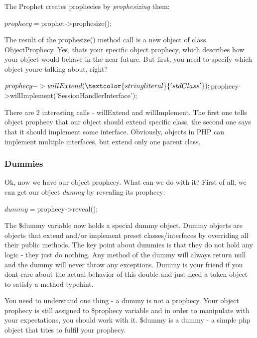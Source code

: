 The Prophet creates prophecies by {\itshape prophesizing} them\+:


\begin{DoxyCode}
$prophecy = $prophet->prophesize();
\end{DoxyCode}


The result of the {\ttfamily prophesize()} method call is a new object of class {\ttfamily Object\+Prophecy}. Yes, that\textquotesingle{}s your specific object prophecy, which describes how your object would behave in the near future. But first, you need to specify which object you\textquotesingle{}re talking about, right?


\begin{DoxyCode}
$prophecy->willExtend(\textcolor{stringliteral}{'stdClass'});
$prophecy->willImplement(\textcolor{stringliteral}{'SessionHandlerInterface'});
\end{DoxyCode}


There are 2 interesting calls -\/ {\ttfamily will\+Extend} and {\ttfamily will\+Implement}. The first one tells object prophecy that our object should extend specific class, the second one says that it should implement some interface. Obviously, objects in P\+HP can implement multiple interfaces, but extend only one parent class.

\subsubsection*{Dummies}

Ok, now we have our object prophecy. What can we do with it? First of all, we can get our object {\itshape dummy} by revealing its prophecy\+:


\begin{DoxyCode}
$dummy = $prophecy->reveal();
\end{DoxyCode}


The {\ttfamily \$dummy} variable now holds a special dummy object. Dummy objects are objects that extend and/or implement preset classes/interfaces by overriding all their public methods. The key point about dummies is that they do not hold any logic -\/ they just do nothing. Any method of the dummy will always return {\ttfamily null} and the dummy will never throw any exceptions. Dummy is your friend if you don\textquotesingle{}t care about the actual behavior of this double and just need a token object to satisfy a method typehint.

You need to understand one thing -\/ a dummy is not a prophecy. Your object prophecy is still assigned to {\ttfamily \$prophecy} variable and in order to manipulate with your expectations, you should work with it. {\ttfamily \$dummy} is a dummy -\/ a simple php object that tries to fulfil your prophecy.

